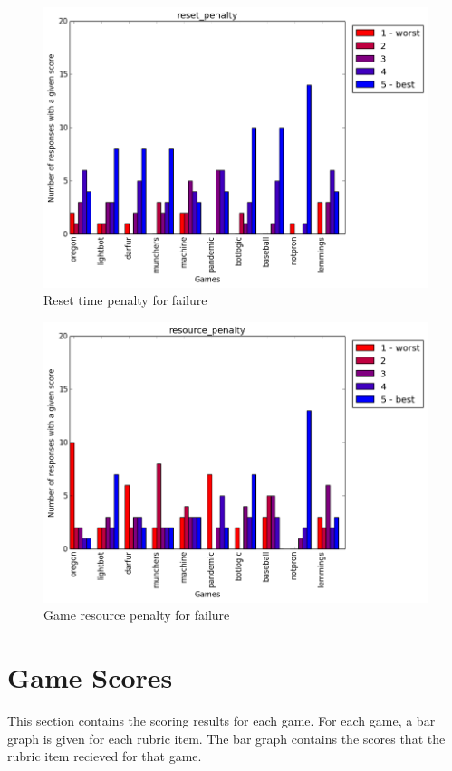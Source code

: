 			\begin{figure}[] 
			\centering 
			\includegraphics[width=\textwidth]{reset_penalty_scores.png} 
			\caption{Reset time penalty for failure}
			\end{figure}

			\begin{figure}[] 
			\centering 
			\includegraphics[width=\textwidth]{resource_penalty_scores.png} 
			\caption{Game resource penalty for failure}
			\end{figure}

			\clearpage

		\section{Game Scores}
			This section contains the scoring results for each game. For each game, a bar graph is given for each rubric item. The bar graph contains the scores that the rubric item recieved for that game.

